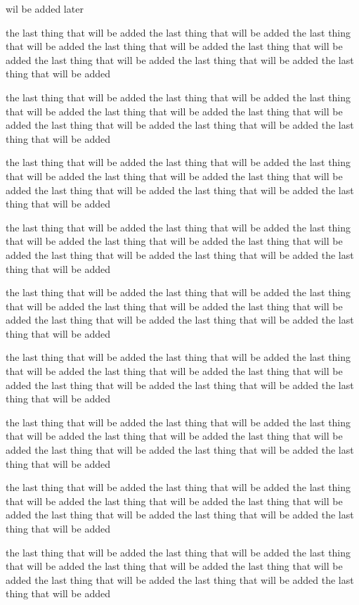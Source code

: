 \par{
wil be added later
}
\par{
the last thing that will be added
the last thing that will be added
the last thing that will be added
the last thing that will be added
the last thing that will be added
the last thing that will be added
the last thing that will be added
the last thing that will be added
}
\par{
the last thing that will be added
the last thing that will be added
the last thing that will be added
the last thing that will be added
the last thing that will be added
the last thing that will be added
the last thing that will be added
the last thing that will be added
}
\par{
the last thing that will be added
the last thing that will be added
the last thing that will be added
the last thing that will be added
the last thing that will be added
the last thing that will be added
the last thing that will be added
the last thing that will be added
}
\par{
the last thing that will be added
the last thing that will be added
the last thing that will be added
the last thing that will be added
the last thing that will be added
the last thing that will be added
the last thing that will be added
the last thing that will be added
}
\par{
the last thing that will be added
the last thing that will be added
the last thing that will be added
the last thing that will be added
the last thing that will be added
the last thing that will be added
the last thing that will be added
the last thing that will be added
}
\par{
the last thing that will be added
the last thing that will be added
the last thing that will be added
the last thing that will be added
the last thing that will be added
the last thing that will be added
the last thing that will be added
the last thing that will be added
}
\par{
the last thing that will be added
the last thing that will be added
the last thing that will be added
the last thing that will be added
the last thing that will be added
the last thing that will be added
the last thing that will be added
the last thing that will be added
}
\par{
the last thing that will be added
the last thing that will be added
the last thing that will be added
the last thing that will be added
the last thing that will be added
the last thing that will be added
the last thing that will be added
the last thing that will be added
}
\par{
the last thing that will be added
the last thing that will be added
the last thing that will be added
the last thing that will be added
the last thing that will be added
the last thing that will be added
the last thing that will be added
the last thing that will be added
}